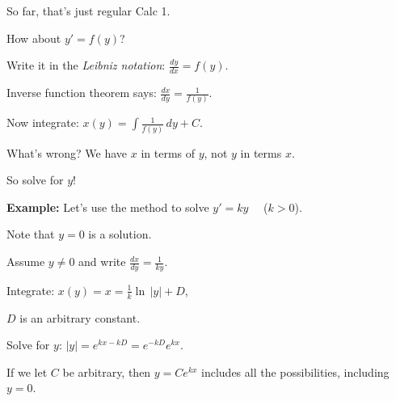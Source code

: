 \documentclass[10pt,aspectratio=169]{beamer}
\begin{document}
\begin{frame}
So far, that's just regular Calc 1.

\medskip
\pause

How about \quad
$y' = f(y)$\quad ?

\medskip
\pause

Write it in the \emph{Leibniz notation}:
\quad
$\displaystyle
\frac{dy}{dx} = f(y)$.

\medskip
\pause

Inverse function theorem says:
\quad
$\displaystyle
\frac{dx}{dy} = \frac{1}{f(y)}$.

\medskip
\pause

Now integrate:
\quad
$\displaystyle
x(y) = \int \frac{1}{f(y)} \,dy + C$.

\medskip
\pause

What's wrong?
\pause
We have $x$ in terms of $y$, not $y$ in terms $x$.

\pause
\medskip

So solve for $y$!
\end{frame}

\begin{frame}
\textbf{Example:}
Let's use the method to solve $y'=ky$ ~~($k > 0$).

\medskip
\pause

Note that $y=0$ is a solution.

\medskip
\pause

Assume $y\not= 0$ and write
\quad$\displaystyle
\frac{dx}{dy} = \frac{1}{ky}$.

\medskip
\pause

Integrate:
\quad
\quad$\displaystyle
x(y) = x = \frac{1}{k} \ln \, \lvert y \rvert + D$,

\medskip

$D$ is an arbitrary constant.

\medskip
\pause

Solve for $y$:
\quad
\quad$\displaystyle
\lvert y \rvert =
e^{kx-kD} = 
e^{-kD} e^{k x}$.

\medskip
\pause

If we let $C$ be arbitrary, then $y=Ce^{kx}$ includes all
the possibilities, including $y=0$.
\end{frame}
\end{document}
